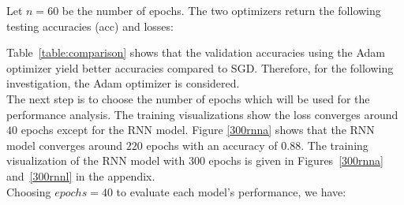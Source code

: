 Let $n=60$ be the number of epochs. The two optimizers return the following
testing accuracies (acc) and losses:

\begin{table}[H]
    \centering
\end{table}

Table~\ref{table:comparison} shows that the validation accuracies using the Adam
optimizer yield better accuracies compared to SGD. Therefore, for the following
investigation, the Adam optimizer is considered.\\

The next step is to choose the number of epochs which will be used for the
performance analysis. The training visualizations show the loss converges around
$40$ epochs except for the RNN model. Figure \ref{300rnna} shows that the RNN
model converges around $220$ epochs with an accuracy of 0.88. The training
visualization of the RNN model with $300$ epochs is given in
Figures~\ref{300rnna} and~\ref{300rnnl} in the appendix.\\

Choosing $epochs = 40$ to evaluate each model's performance, we have:

\begin{table}[H]
    \centering
\end{table}

